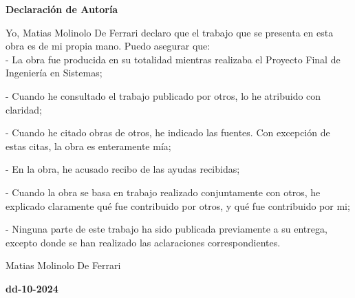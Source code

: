 {\huge\bfseries \space Declaración de Autoría}

\thispagestyle{empty}


\bigskip
\bigskip

Yo, Matias Molinolo De Ferrari declaro que el trabajo que se presenta en esta obra es de mi propia mano. Puedo asegurar que:
\\

- La obra fue producida en su totalidad mientras realizaba el Proyecto Final de Ingeniería en Sistemas;


- Cuando he consultado el trabajo publicado por otros, lo he atribuido con claridad;


- Cuando he citado obras de otros, he indicado las fuentes. Con excepción de estas citas, la obra es enteramente mía;


- En la obra, he acusado recibo de las ayudas recibidas;


- Cuando la obra se basa en trabajo realizado conjuntamente con otros, he explicado claramente qué fue contribuido por otros, y qué fue contribuido por mi;


- Ninguna parte de este trabajo ha sido publicada previamente a su entrega, excepto donde se han realizado las aclaraciones correspondientes.

\bigskip
\begin{center}
\bigskip\bigskip\bigskip\bigskip\bigskip\bigskip\bigskip\bigskip
Matias Molinolo De Ferrari
\end{center}


\vspace*{\fill}

\begin{center}
\textbf{dd-10-2024}%
\end{center}
\newpage